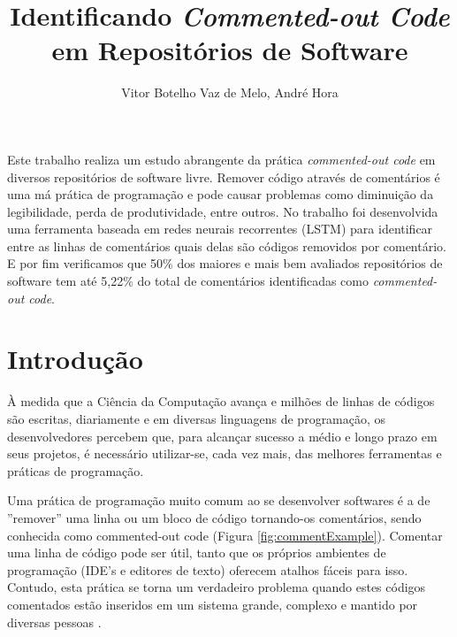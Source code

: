\documentclass[12pt]{article}
\title{Identificando \textit{Commented-out Code} em Repositórios de Software}
\author{Vitor Botelho Vaz de Melo\inst{1}, André Hora\inst{1} }
\begin{document}
 

\maketitle

     
\begin{resumo} 
  Este trabalho realiza um estudo abrangente da prática \textit{commented-out code}
  em diversos repositórios de software livre. Remover código através de comentários 
  é uma má prática de programação e pode causar problemas como diminuição da 
  legibilidade, perda de produtividade, entre outros. No trabalho foi desenvolvida
  uma ferramenta baseada em redes neurais recorrentes (LSTM) para identificar entre as 
  linhas de comentários quais delas são códigos removidos por comentário. E por fim 
  verificamos que 50\% dos maiores e mais bem avaliados repositórios de software tem até
  5,22\% do total de comentários identificadas como \textit{commented-out code}.

\end{resumo}


\section{Introdução} \label{sec:intr}

À medida que a Ciência da Computação avança e milhões de linhas de códigos são 
escritas, diariamente e em diversas linguagens de programação, os desenvolvedores 
percebem que, para alcançar sucesso a médio e longo prazo em seus projetos, é
necessário utilizar-se, cada vez mais, das melhores ferramentas e práticas de 
programação. 

Uma prática de programação muito comum ao se desenvolver softwares é a de 
''remover'' uma linha ou um bloco de código tornando-os comentários, sendo conhecida  
como commented-out code (Figura \ref{fig:commentExample}). Comentar uma linha de código 
pode ser útil, tanto que 
os próprios ambientes de programação (IDE's e editores de texto) oferecem atalhos 
fáceis para isso. Contudo, esta prática se torna um verdadeiro problema quando 
estes códigos comentados estão inseridos em um sistema grande, complexo e
mantido por diversas pessoas \cite{cleanCode}.
\end{document}
